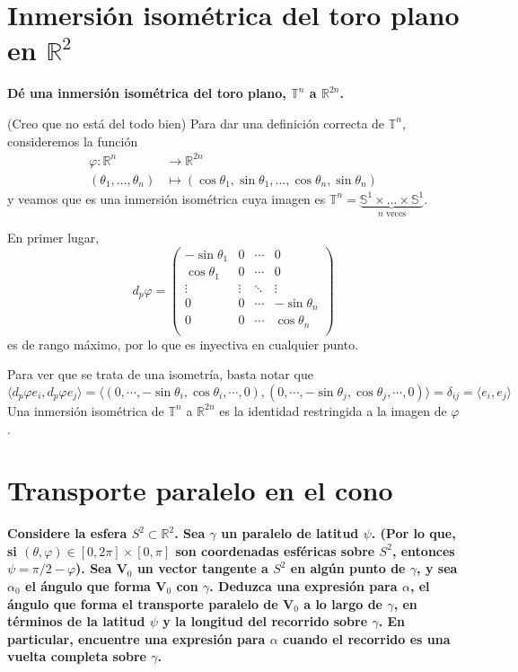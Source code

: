 \documentclass[11pt]{article}
\begin{document}
\section{Inmersión isométrica del toro plano en $\mathbb R^2$}
\textbf{Dé una inmersión isométrica del toro plano, $\mathbb{T}^n$ a $\mathbb{R}^{2n}$.}\par
(Creo que no está del todo bien) Para dar una definición correcta de $\mathbb{T}^n$, consideremos la función 
\begin{align*}
\varphi:\mathbb{R}^n&\longrightarrow\mathbb{R}^{2n}\\(\theta_1,...,\theta_n)&\mapsto(\cos{\theta_1},\sin{\theta_1},...,\cos{\theta_n},\sin{\theta_n})
\end{align*}
y veamos que es una inmersión isométrica cuya imagen es $\mathbb{T}^n=\underbrace{\mathbb{S}^1\times...\times\mathbb{S}^1}_{n\text{ veces}}$.\par
En primer lugar,
\begin{equation*}
    d_p\varphi =
\begin{pmatrix}
-\sin{\theta_1}& 0&\cdots&0\\
\cos{\theta_1}&0&\cdots&0\\
\vdots&\vdots&\ddots&\vdots\\
0&0&\cdots&-\sin{\theta_n}\\
0&0&\cdots&\cos{\theta_n}\\
\end{pmatrix}
\end{equation*}
es de rango máximo, por lo que es inyectiva en cualquier punto.\par
Para ver que se trata de una isometría, basta notar que
$$\langle d_p\varphi e_i,d_p\varphi e_j\rangle=\langle (0,\cdots, -\sin{\theta_i},\cos{\theta_i},\cdots,0),(0,\cdots,-\sin{\theta_j},\cos{\theta_j},\cdots,0)\rangle=\delta_{ij}=\langle e_i,e_j\rangle$$
Una inmersión isométrica de $\mathbb{T}^n$ a $\mathbb{R}^{2n}$ es la identidad restringida a la imagen de $\varphi$.

\newpage
\section{Transporte paralelo en el cono}
\textbf{Considere la esfera $S^2\subset\mathbb{R}^2$. Sea $\gamma$ un paralelo de latitud $\psi$. (Por lo que, si $(\theta,\varphi)\in[0,2\pi]\times[0,\pi]$ son coordenadas esféricas sobre $S^2$, entonces $\psi=\pi/2-\varphi$). Sea $\mathbf{V}_0$ un vector tangente a $S^2$ en algún punto de $\gamma$, y sea $\alpha_0$ el ángulo que forma $\mathbf{V}_0$ con $\gamma$. Deduzca una expresión para $\alpha$, el ángulo que forma el transporte paralelo de $\mathbf{V}_0$ a lo largo de $\gamma$, en términos de la latitud $\psi$ y la longitud del recorrido sobre $\gamma$. En particular, encuentre una expresión para $\alpha$ cuando el recorrido es una vuelta completa sobre $\gamma$.}\par
\end{document}
